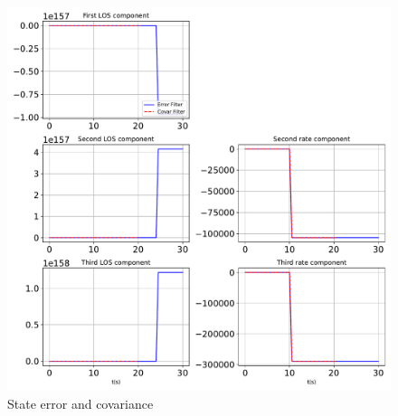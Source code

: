 \begin{figure}[htbp]\centerline{\includegraphics[height=0.9\textwidth, keepaspectratio]{AutoTeX/StatesPlotUpdate}}\caption{State error and covariance}\label{fig:StatesPlotUpdate}\end{figure}